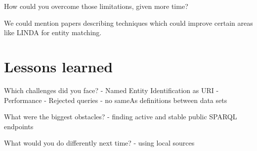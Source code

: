 \documentclass[11pt,titlepage,oneside,openany]{article}
\begin{document}
How could you overcome those limitations, given more time?

We could mention papers describing techniques which could improve certain areas like LINDA \cite{boehm_linda:_2012} for entity matching. 


\section{Lessons learned}
Which challenges did you face?
- Named Entity Identification as URI
- Performance
- Rejected queries
- no sameAs definitions between data sets


What were the biggest obstacles?
- finding active and stable public SPARQL endpoints


What would you do differently next time?
- using local sources
\pagebreak

  
%
\end{document}
